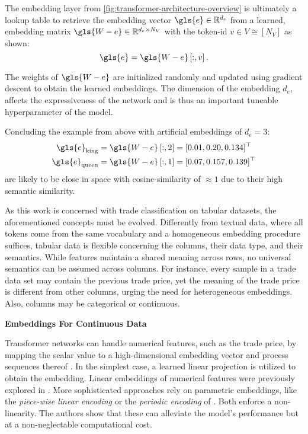 The embedding layer from \cref{fig:transformer-architecture-overview} is ultimately a lookup table to retrieve the embedding vector $\gls{e} \in \mathbb{R}^{d_{e}}$  from a learned, embedding matrix $\gls{W-e} \in \mathbb{R}^{d_{e} \times N_{V}}$ with the token-id $v \in V \cong\left[N_{V}\right]$ as shown:
\begin{equation}
    \gls{e}=\gls{W-e}\left[:, v\right].
\end{equation}

The weights of $\gls{W-e}$ are initialized randomly and updated using gradient descent to obtain the learned embeddings. The dimension of the embedding $d_e$, affects the expressiveness of the network and is thus an important tuneable hyperparameter of the model.

Concluding the example from above with artificial embeddings of $d_e=3$:
\begin{equation}
\begin{aligned}
    \gls{e}_{\text{king}}&=\gls{W-e}\left[:,2\right] = [0.01, 0.20, 0.134]^{\top}\\
    \gls{e}_{\text{queen}}&=\gls{W-e}\left[:,1\right] = [0.07, 0.157, 0.139]^{\top}\\
\end{aligned}
\end{equation}
are likely to be close in space with cosine-similarity of $\approx 1$ due to their high semantic similarity.

As this work is concerned with trade classification on tabular datasets, the aforementioned concepts must be evolved. Differently from textual data, where all tokens come from the same vocabulary and a homogeneous embedding procedure suffices, tabular data is flexible concerning the columns, their data type, and their semantics. While features maintain a shared meaning across rows, no universal semantics can be assumed across columns. For instance, every sample in a trade data set may contain the previous trade price, yet the meaning of the trade price is different from other columns, urging the need for heterogeneous embeddings. Also, columns may be categorical or continuous.

\textbf{Embeddings For Continuous Data}

Transformer networks can handle numerical features, such as the trade price, by mapping the scalar value to a high-dimensional embedding vector and process sequences thereof \autocite[][1]{gorishniyEmbeddingsNumericalFeatures2022}. In the simplest case, a learned linear projection is utilized to obtain the embedding. Linear embeddings of numerical features were previously explored in \textcites[][1]{kossenSelfAttentionDatapointsGoing2021}[][1]{somepalliSAINTImprovedNeural2021}[][1]{gorishniyRevisitingDeepLearning2021}. More sophisticated approaches rely on parametric embeddings, like the \emph{piece-wise linear encoding} or the \emph{periodic encoding} of \textcite[][10]{gorishniyEmbeddingsNumericalFeatures2022}. Both enforce a non-linearity. The authors show that these can alleviate the model's performance but at a non-neglectable computational cost.

